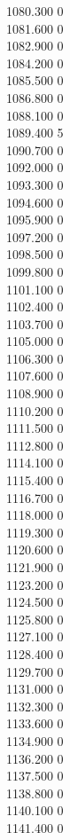 { 1080.300	0 \\
 1081.600	0 \\
 1082.900	0 \\
 1084.200	0 \\
 1085.500	0 \\
 1086.800	0 \\
 1088.100	0 \\
 1089.400	5 \\
 1090.700	0 \\
 1092.000	0 \\
 1093.300	0 \\
 1094.600	0 \\
 1095.900	0 \\
 1097.200	0 \\
 1098.500	0 \\
 1099.800	0 \\
 1101.100	0 \\
 1102.400	0 \\
 1103.700	0 \\
 1105.000	0 \\
 1106.300	0 \\
 1107.600	0 \\
 1108.900	0 \\
 1110.200	0 \\
 1111.500	0 \\
 1112.800	0 \\
 1114.100	0 \\
 1115.400	0 \\
 1116.700	0 \\
 1118.000	0 \\
 1119.300	0 \\
 1120.600	0 \\
 1121.900	0 \\
 1123.200	0 \\
 1124.500	0 \\
 1125.800	0 \\
 1127.100	0 \\
 1128.400	0 \\
 1129.700	0 \\
 1131.000	0 \\
 1132.300	0 \\
 1133.600	0 \\
 1134.900	0 \\
 1136.200	0 \\
 1137.500	0 \\
 1138.800	0 \\
 1140.100	0 \\
 1141.400	0 \\
}
